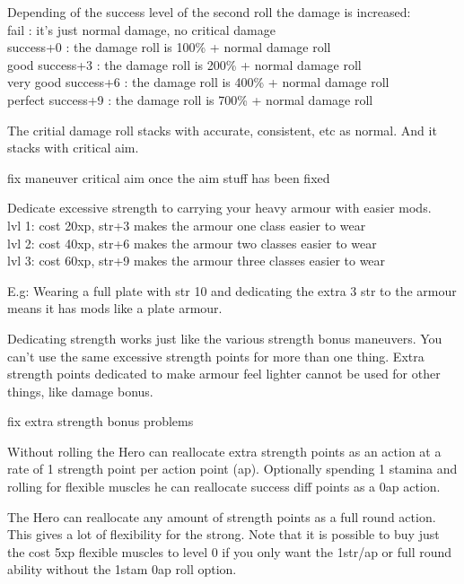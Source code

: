Depending of the success level of the second roll the damage is increased:\\
fail : it's just normal damage, no critical damage \\
success+0 : the damage roll is 100\% + normal damage roll \\
good success+3 : the damage roll is 200\% + normal damage roll \\
very good success+6 : the damage roll is 400\% + normal damage roll \\
perfect success+9 : the damage roll is 700\% + normal damage roll

The critial damage roll stacks with accurate, consistent, etc as normal. And it stacks with critical aim.


\TODO fix maneuver critical aim once the aim stuff has been fixed


Dedicate excessive strength to carrying your heavy armour with easier mods.\\
lvl 1: cost 20xp, str+3 makes the armour one class easier to wear\\
lvl 2: cost 40xp, str+6 makes the armour two classes easier to wear\\
lvl 3: cost 60xp, str+9 makes the armour three classes easier to wear

E.g: Wearing a full plate with str 10 and dedicating the extra 3 str to the armour means it has mods like a plate armour.

Dedicating strength works just like the various strength bonus maneuvers. You can't use the same excessive strength points for more than one thing. Extra strength points dedicated to make armour feel lighter cannot be used for other things, like damage bonus.

\todo fix extra strength bonus problems


Without rolling the Hero can reallocate extra strength points as an action at a rate of 1 strength point per action point (ap). Optionally spending 1 stamina and rolling for flexible muscles he can reallocate success diff points as a 0ap action.

The Hero can reallocate any amount of strength points as a full round action.
This gives a lot of flexibility for the strong. Note that it is possible to buy just the cost 5xp flexible muscles to level 0 if you only want the 1str/ap or full round ability without the 1stam 0ap roll option.

